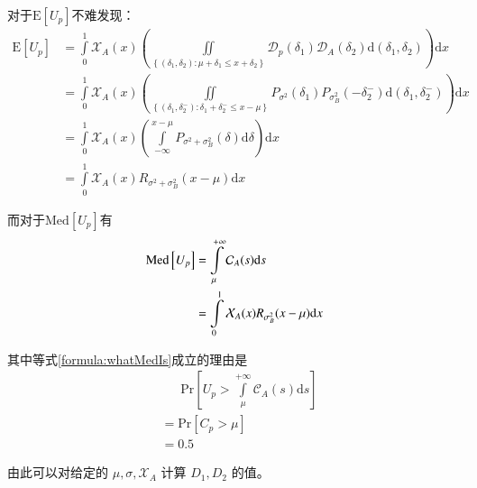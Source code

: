             对于$\mathrm{E}\left[U_p\right]$不难发现：
            \begin{align*}
                \mathrm{E}\left[U_p\right]
                &=\int\limits_0^1 \mathcal{X}_A(x)\left(\iint\limits_{\left\{(\delta_1,\delta_2):\mu+\delta_1\leq x+\delta_2\right\}} \mathcal{D}_p(\delta_1)\mathcal{D}_A(\delta_2)\mathrm{d}(\delta_1,\delta_2)\right)\mathrm{d}x \\
                &=\int\limits_0^1 \mathcal{X}_A(x)\left(\iint\limits_{\left\{(\delta_1,\delta_2^-):\delta_1+\delta_2^-\leq x-\mu\right\}} P_{\sigma^2}(\delta_1)P_{\sigma_B^2}(-\delta_2^-)\mathrm{d}(\delta_1,\delta_2^-)\right)\mathrm{d}x \\
                &=\int\limits_0^1 \mathcal{X}_A(x)\left(\int\limits_{-\infty}^{x-\mu} P_{\sigma^2+\sigma_B^2}(\delta)\mathrm{d}\delta\right)\mathrm{d}x \\
                &=\int\limits_0^1 \mathcal{X}_A(x)R_{\sigma^2+\sigma_B^2}(x-\mu) \mathrm{d}x
            \end{align*}

            而对于$\mathrm{Med}\left[U_p\right]$有
            \begin{align}
                \mathrm{Med}\left[U_p\right]
                &=\int\limits_{\mu}^{+\infty} \mathcal{C}_A(s)\mathrm{d}s \label{formula:whatMedIs}\\
                &=\int\limits_0^1 \mathcal{X}_A(x)R_{\sigma_B^2}(x-\mu) \mathrm{d}x \notag
            \end{align}

            其中等式\eqref{formula:whatMedIs}成立的理由是
            \begin{align*}
            &\phantom{=\ }\mathrm{Pr}\left[U_p>\int\limits_{\mu}^{+\infty} \mathcal{C}_A(s)\mathrm{d}s\right] \\
            &=\mathrm{Pr}\left[C_p>\mu\right] \\
            &=0.5
            \end{align*}

            由此可以对给定的 $\mu,\sigma,\mathcal{X}_A$ 计算 $D_1,D_2$ 的值。

            \vspace{1.5ex}

